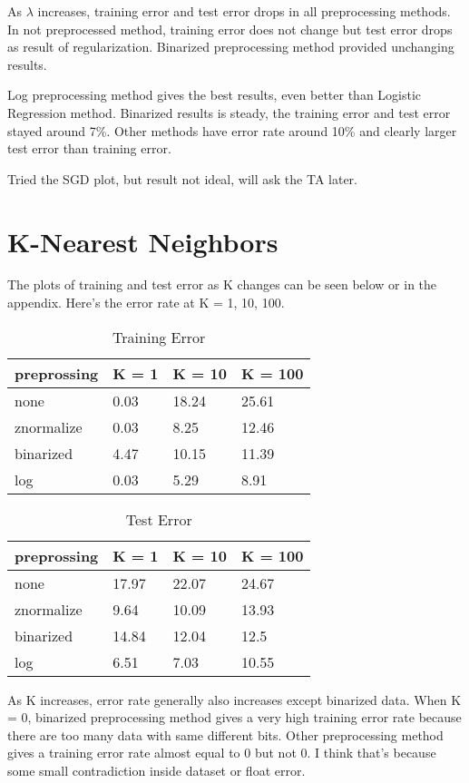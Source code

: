 \documentclass[11pt, oneside]{article}
\begin{document}
As $\lambda$ increases, training error and test error drops in all preprocessing methods. In not preprocessed method, training error does not change but test error drops as result of regularization. Binarized preprocessing method provided unchanging results.

Log preprocessing method gives the best results, even better than Logistic Regression method. Binarized results is steady, the training error and test error stayed around 7\%. Other methods have error rate around 10\% and clearly larger test error than training error.

Tried the SGD plot, but result not ideal, will ask the TA later.

\section{K-Nearest Neighbors}

The plots of training and test error as K changes can be seen below or in the appendix.
Here's the error rate at K = 1, 10, 100.
\begin{table}[h]
\centering
\caption{Training Error}
\begin{tabular}{l|lll}
\hline
preprossing & K = 1     & K = 10    & K = 100   \\
\hline
none       & 0.03 & 18.24 & 25.61 \\
znormalize & 0.03 & 8.25 & 12.46  \\
binarized  & 4.47 & 10.15 & 11.39 \\
log        & 0.03  & 5.29  & 8.91 \\
\hline
\end{tabular}
\end{table}

\begin{table}[h]
\centering
\caption{Test Error}
\begin{tabular}{l|lll}
\hline
preprossing & K = 1     & K = 10    & K = 100   \\
\hline
none       & 17.97 & 22.07 & 24.67 \\
znormalize & 9.64 & 10.09 & 13.93  \\
binarized  & 14.84 & 12.04 & 12.5 \\
log        & 6.51  & 7.03  & 10.55 \\
\hline
\end{tabular}
\end{table}

As K increases, error rate generally also increases except binarized data. When K = 0, binarized preprocessing method gives a very high training error rate because there are too many data with same different bits. Other preprocessing method gives a training error rate almost equal to 0 but not 0. I think that's because some small contradiction inside dataset or float error.
\end{document}
